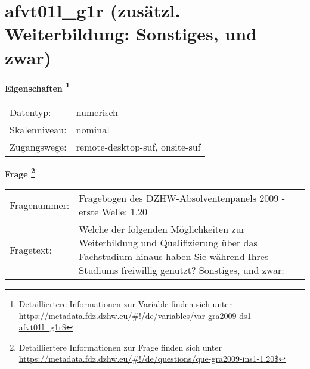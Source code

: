 
    \setcounter{footnote}{0}

    \vspace*{-1.8cm}
	\section{afvt01l\_g1r (zusätzl. Weiterbildung: Sonstiges, und zwar)}
	\label{section:afvt01l_g1r}



    \vspace*{0.5cm}
    \noindent\textbf{Eigenschaften
	\footnote{Detailliertere Informationen zur Variable finden sich unter
		\url{https://metadata.fdz.dzhw.eu/\#!/de/variables/var-gra2009-ds1-afvt01l_g1r$}}}\\
	\begin{tabularx}{\hsize}{@{}lX}
	Datentyp: & numerisch \\
	Skalenniveau: & nominal \\
	Zugangswege: &
	  remote-desktop-suf, 
	  onsite-suf
 \\
    \end{tabularx}



				\vspace*{0.5cm}
                \noindent\textbf{Frage
	                \footnote{Detailliertere Informationen zur Frage finden sich unter
		              \url{https://metadata.fdz.dzhw.eu/\#!/de/questions/que-gra2009-ins1-1.20$}}}\\
				\begin{tabularx}{\hsize}{@{}lX}
					Fragenummer: &
					  Fragebogen des DZHW-Absolventenpanels 2009 - erste Welle:
					  1.20
 \\
					Fragetext: & Welche der folgenden Möglichkeiten zur Weiterbildung und Qualifizierung über das Fachstudium hinaus haben Sie während Ihres Studiums freiwillig genutzt? Sonstiges, und zwar: \\
				\end{tabularx}





